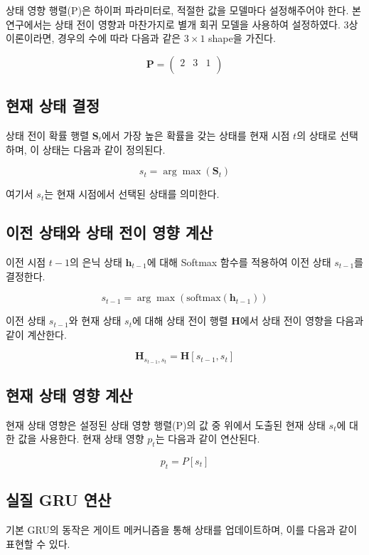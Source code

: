 \documentclass[11pt]{report}
\begin{document}
상태 영향 행렬(P)은 하이퍼 파라미터로, 적절한 값을 모델마다 설정해주어야 한다. 
본 연구에서는 상태 전이 영향과 마찬가지로 별개 회귀 모델을 사용하여 설정하였다. 
3상 이론이라면, 경우의 수에 따라 다음과 같은 $3 \times 1$ shape을 가진다. 

$$
\mathbf{P} = 
\begin{pmatrix}
	2 & 3 & 1\\
\end{pmatrix}
$$

\subsection{현재 상태 결정}

상태 전이 확률 행렬 \( \mathbf{S}_t \)에서 가장 높은 확률을 갖는 상태를 현재 시점 \( t \)의 상태로 선택하며, 이 상태는 다음과 같이 정의된다.

\[
s_t = \arg\max(\mathbf{S}_t)
\]

여기서 \( s_t \)는 현재 시점에서 선택된 상태를 의미한다.

\subsection{이전 상태와 상태 전이 영향 계산}

이전 시점 \( t-1 \)의 은닉 상태 \( \mathbf{h}_{t-1} \)에 대해 Softmax 함수를 적용하여 이전 상태 \( s_{t-1} \)를 결정한다.

\[
s_{t-1} = \arg\max(\text{softmax}(\mathbf{h}_{t-1}))
\]

이전 상태 \( s_{t-1} \)와 현재 상태 \( s_t \)에 대해 상태 전이 행렬 \( \mathbf{H} \)에서 상태 전이 영향을 다음과 같이 계산한다.

\[
\mathbf{H}_{s_{t-1}, s_t} = \mathbf{H}[s_{t-1}, s_t]
\]

\subsection{현재 상태 영향 계산}
현재 상태 영향은 설정된 상태 영향 행렬(P)의 값 중 위에서 도출된 현재 상태 \( s_t \)에 대한 값을 사용한다. 
현재 상태 영향 $p_t$는 다음과 같이 연산된다. 

$$
p_t = P[s_t]
$$

\subsection{실질 GRU 연산}

기본 GRU의 동작은 게이트 메커니즘을 통해 상태를 업데이트하며, 이를 다음과 같이 표현할 수 있다. 
\end{document}
